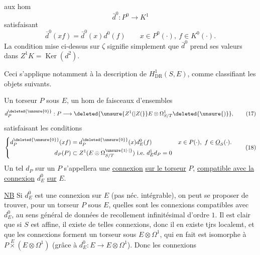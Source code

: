 aux hom
\[
\bar d^0:P^0\longrightarrow K^1
\]
satisfaisant
\[
\bar d^0(xf)=\bar d^0(x)d^0(f)\qquad x\in P^0(\cdot),\ f\in K^0(\cdot).
\]
La condition mise ci-dessus sur $\zeta$ signifie simplement que $\bar d^0$ prend ses valeurs dans $Z^1K=\operatorname{Ker}(d^2)$.

Ceci s'applique notamment à la description
de $H^1_{\mathrm{DR}}(S,E)$, comme classifiant les objets suivants.

Un torseur $P$ sous $E$, un hom de faisceaux
d'ensembles
\[
d_P^{\deleted{\unsure{0}}}:P\longrightarrow\deleted{\unsure{Z^1(|Z(}}E\otimes\Omega^1_{S/T}\deleted{\unsure{)}}, \tag*{(17)}
\]
satisfaisant les conditions
\[
\left\{\begin{aligned}
d_P^{\deleted{\unsure{0}}}(xf)&=d_P^{\deleted{\unsure{0}}}(x)d_E^0(f)
 &x&\in P(\cdot),\ f\in\underline O_S(\cdot).\\
d_P(P)&\subset Z^1(E\otimes\Omega^{\unsure{1|\cdot|{}}}_{S/T})\ \text{i.e.}\ d_E^1d_P=0
\end{aligned}\right. \tag*{(18)}
\]
Un tel $d_P$ sur un $P$ s'appellera une \uline{connexion}  \uline{sur
le torseur} $P$, \uline{compatible avec la connexion}  $d_E^0$ \uline{sur} $E$.

\uline{NB} Si $d_E^0$ est une connexion sur $E$ (pas néc. intégrable),
 on peut se proposer de trouver, pour un torseur $P$ sous $E$,
quelles sont les connexions compatibles avec $d_E^0$, au sens
général  de données de recollement infinitésimal
d'ordre $1$. Il est clair que si $S$ est affine, il existe
de telles connexions, donc il en existe tjrs localemt,
et que les connexions forment un torseur sous
$E\otimes\Omega^1$, qui en fait est isomorphe à $P\mathbin{\overset E{\times}}(E\otimes\Omega^1)$
(grâce à $d_E^0:E\longrightarrow E\otimes\Omega^1$). Donc les connexions
